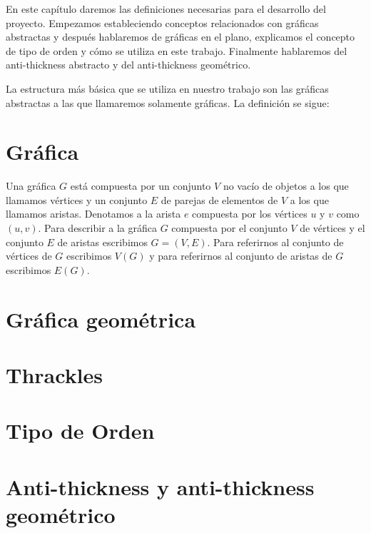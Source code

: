En este capítulo daremos las definiciones necesarias para el desarrollo del proyecto.
Empezamos estableciendo conceptos relacionados con gráficas abstractas y después
hablaremos de gráficas en el plano, explicamos el concepto de tipo de orden y cómo
se utiliza en este trabajo. Finalmente hablaremos del anti-thickness abstracto
y del anti-thickness geométrico.

La estructura más básica que se utiliza en nuestro trabajo son las gráficas abstractas
a las que llamaremos solamente gráficas. La definición se sigue:
\section{Gráfica}
Una gráfica $G$ está compuesta por un conjunto $V$ no vacío de objetos a los que llamamos vértices
y un conjunto $E$ de parejas de elementos de $V$ a los que llamamos aristas. Denotamos
a la arista $e$ compuesta por los vértices $u$ y $v$ como $(u,v)$. Para describir a la gráfica $G$
compuesta por el conjunto $V$ de vértices y el conjunto $E$ de aristas escribimos $G=(V,E)$.
Para referirnos al conjunto de vértices de $G$ escribimos $V(G)$ y para referirnos
al conjunto de aristas de $G$ escribimos $E(G)$.
\section{Gráfica geométrica}
\section{Thrackles}
\section{Tipo de Orden}
\section{Anti-thickness y anti-thickness geométrico}
